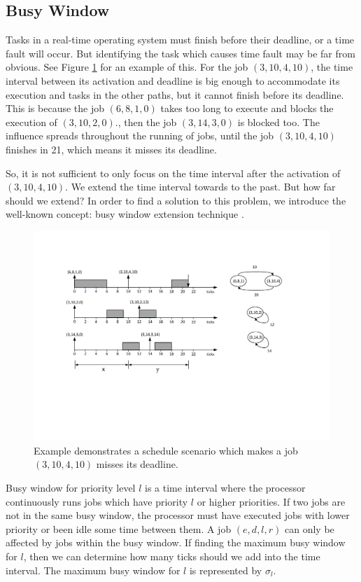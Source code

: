 \documentclass[10pt,conference]{IEEEtran}
\begin{document}
\subsection{Busy Window}\label{section_busywindow}

Tasks in a real-time operating system must finish before their deadline, or a time fault will occur. But identifying the task which causes time fault may be far from obvious. See Figure \ref{figure_busywindows} for an example of this. For the job $(3,10,4,10)$, the time interval between its activation and deadline is big enough to accommodate its execution and tasks in the other paths, but it cannot finish before its deadline. This is because the job $(6,8,1,0)$ takes too long to execute and blocks the execution of $(3,10,2,0)$., then the job $(3,14,3,0)$ is blocked too. The influence spreads throughout the running of jobs, until the job $(3,10,4,10)$ finishes in 21, which means it misses its deadline. 

So, it is not sufficient to only focus on the time interval after the activation of $(3,10,4,10)$. We extend the time interval towards to the past. But how far should we extend? In order to find a solution to this problem, we introduce the well-known concept: busy window extension technique \cite{DBLP:conf/rtss/Lehoczky90}. 
\begin{figure}  
  \centering
  \includegraphics[scale=.57]{graphics/figure_busywindow.pdf}
  \caption{Example demonstrates a schedule scenario which makes a job $(3,10,4,10)$ misses its deadline. }\label{figure_busywindows}
\end{figure}

Busy window for priority level $l$ is a time interval where the processor continuously runs jobs which have priority $l$ or higher priorities. If two jobs are not in the same busy window, the processor must have executed jobs with lower priority or been idle some time between them. A job $(e,d,l,r)$ can only be affected by jobs within the busy window. If finding the maximum busy window for $l$, then we can determine how many ticks should we add into the time interval. The maximum busy window for $l$ is represented by $\sigma_l$.
\end{document}
